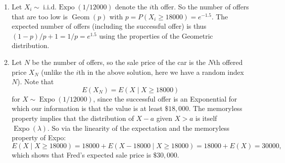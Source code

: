 

\setcounter{theorem}{37}
\begin{exercise}[BH.5.38]
\begin{solution}
    \begin{enumerate}
        \item Let $X_i \sim \operatorname{i.i.d.~ Expo}(1 / 12000)$ denote the $i$th offer. So the number of offers that are too low is $\operatorname{Geom}(p)$ with $p=P\left(X_i \geq 18000\right)=e^{-1.5}$. The expected number of offers (including the successful offer) is thus $(1-p) / p+1=1 / p=e^{1.5}$ using the properties of the Geometric distribution.
        \item Let $N$ be the number of offers, so the sale price of the car is the $N$th offered price $X_N$ (unlike the $i$th in the above solution, here we have a random index $N$). Note that
        $$
        E\left(X_N\right)=E(X \mid X \geq 18000)
        $$
        for $X \sim \operatorname{Expo}(1 / 12000)$, since the successful offer is an Exponential for which our information is that the value is at least $\$ 18,000$. The memoryless property implies that the distribution of $X-a$ given $X>a$ is itself $\operatorname{Expo}(\lambda)$. So via the linearity of the expectation and the memoryless property of Expo:
        $$
        E(X \mid X \geq 18000)=	18000+		E(X-18000 \mid X \geq 18000)=18000+E(X)=30000,
        $$
        which shows that Fred's expected sale price is $\$ 30,000$.
    \end{enumerate} 
\end{solution}
\end{exercise}



